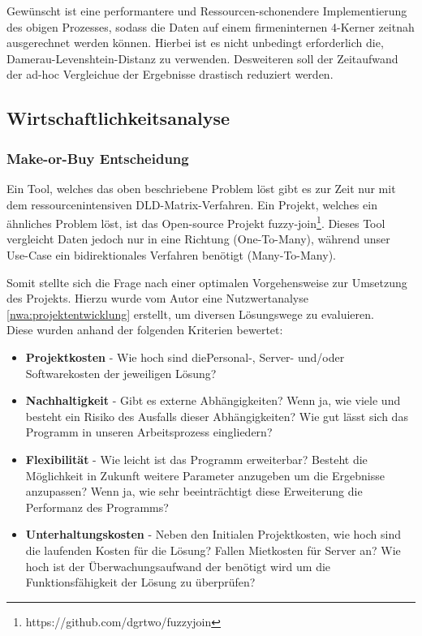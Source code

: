 Gewünscht ist eine performantere und Ressourcen-schonendere Implementierung des obigen Prozesses,
sodass die Daten auf einem firmeninternen 4-Kerner zeitnah ausgerechnet werden können.
Hierbei ist es nicht unbedingt erforderlich die, Damerau-Levenshtein-Distanz zu verwenden. Desweiteren soll der Zeitaufwand der ad-hoc 
Vergleichue der Ergebnisse drastisch reduziert werden.\par




\subsection{Wirtschaftlichkeitsanalyse}
\subsubsection{Make-or-Buy Entscheidung}
Ein Tool, welches das oben beschriebene Problem löst gibt es zur Zeit nur mit dem
ressourcenintensiven DLD-Matrix-Verfahren. Ein Projekt, welches ein ähnliches
Problem löst, ist das Open-source Projekt fuzzy-join\footnote{https://github.com/dgrtwo/fuzzyjoin}.
Dieses Tool vergleicht Daten jedoch nur in eine Richtung (One-To-Many), während unser
Use-Case ein bidirektionales Verfahren benötigt (Many-To-Many).\par

Somit stellte sich die Frage nach einer optimalen Vorgehensweise zur Umsetzung des
Projekts. Hierzu wurde vom Autor eine Nutzwertanalyse \ref{nwa:projektentwicklung} erstellt, um diversen Lösungswege zu evaluieren. \\
Diese wurden anhand der folgenden Kriterien bewertet:


\begin{itemize}
    \item \textbf{Projektkosten} - Wie hoch sind diePersonal-, Server- und/oder Softwarekosten der jeweiligen Lösung?

    \item \textbf{Nachhaltigkeit} - Gibt es externe Abhängigkeiten? Wenn ja, wie viele und besteht ein Risiko des Ausfalls dieser Abhängigkeiten? Wie gut lässt sich das Programm in unseren Arbeitsprozess eingliedern? 

    \item \textbf{Flexibilität} - Wie leicht ist das Programm erweiterbar? Besteht die Möglichkeit in Zukunft weitere Parameter anzugeben um die Ergebnisse anzupassen? Wenn ja, wie sehr beeinträchtigt diese Erweiterung die Performanz des Programms?

    \item \textbf{Unterhaltungskosten} - Neben den Initialen Projektkosten, wie hoch sind die laufenden Kosten für die Lösung? Fallen Mietkosten für Server an? Wie hoch ist der Überwachungsaufwand der benötigt wird um die Funktionsfähigkeit der Lösung zu überprüfen?

\end{itemize}



